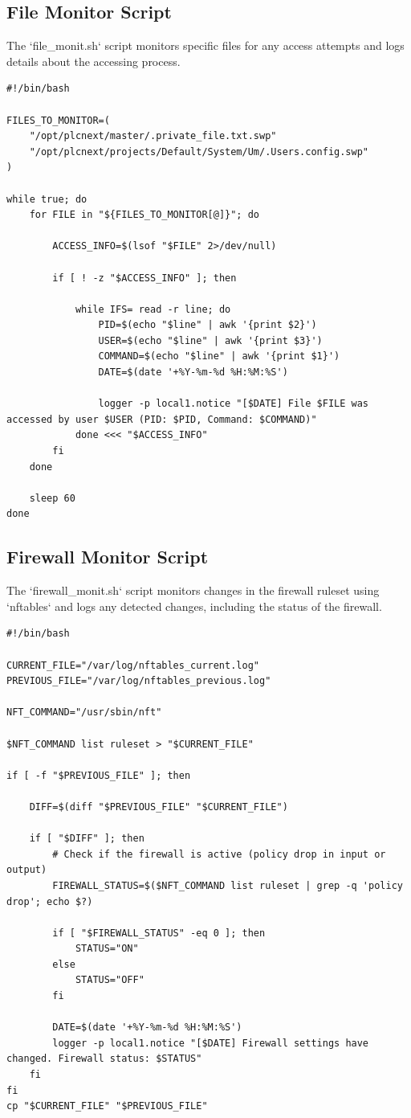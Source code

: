 \documentclass[Master,BMR,english]{twbook}
\begin{document}
\subsection{File Monitor Script}
The `file\_monit.sh` script monitors specific files for any access attempts and logs details about the accessing process.

\begin{verbatim}
#!/bin/bash

FILES_TO_MONITOR=(
    "/opt/plcnext/master/.private_file.txt.swp" 
    "/opt/plcnext/projects/Default/System/Um/.Users.config.swp"
)

while true; do
    for FILE in "${FILES_TO_MONITOR[@]}"; do

        ACCESS_INFO=$(lsof "$FILE" 2>/dev/null)

        if [ ! -z "$ACCESS_INFO" ]; then

            while IFS= read -r line; do
                PID=$(echo "$line" | awk '{print $2}')
                USER=$(echo "$line" | awk '{print $3}')
                COMMAND=$(echo "$line" | awk '{print $1}')
                DATE=$(date '+%Y-%m-%d %H:%M:%S')

                logger -p local1.notice "[$DATE] File $FILE was accessed by user $USER (PID: $PID, Command: $COMMAND)"
            done <<< "$ACCESS_INFO"
        fi
    done

    sleep 60
done
\end{verbatim}

\subsection{Firewall Monitor Script}
The `firewall\_monit.sh` script monitors changes in the firewall ruleset using `nftables` and logs any detected changes, including the status of the firewall.

\begin{verbatim}
#!/bin/bash

CURRENT_FILE="/var/log/nftables_current.log"
PREVIOUS_FILE="/var/log/nftables_previous.log"

NFT_COMMAND="/usr/sbin/nft"

$NFT_COMMAND list ruleset > "$CURRENT_FILE"

if [ -f "$PREVIOUS_FILE" ]; then

    DIFF=$(diff "$PREVIOUS_FILE" "$CURRENT_FILE")

    if [ "$DIFF" ]; then
        # Check if the firewall is active (policy drop in input or output)
        FIREWALL_STATUS=$($NFT_COMMAND list ruleset | grep -q 'policy drop'; echo $?)

        if [ "$FIREWALL_STATUS" -eq 0 ]; then
            STATUS="ON"
        else
            STATUS="OFF"
        fi

        DATE=$(date '+%Y-%m-%d %H:%M:%S')
        logger -p local1.notice "[$DATE] Firewall settings have changed. Firewall status: $STATUS"
    fi
fi
cp "$CURRENT_FILE" "$PREVIOUS_FILE"
\end{verbatim}
\end{document}
